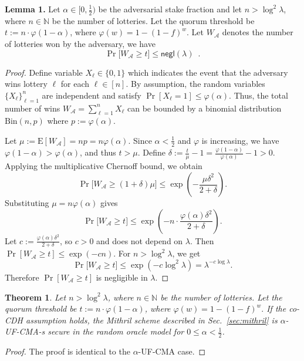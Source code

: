 \documentclass{article}
\newtheorem{theorem}{Theorem}[section]
\begin{document}

\noindent
\textbf{Lemma 1.}
Let $\alpha \in [0,\tfrac12)$ be the adversarial stake fraction and let $n>\log^2\lambda$, where $n\in\mathbb{N}$ be the number of lotteries. Let the quorum threshold be $t :=  n\cdot \varphi(1-\alpha)$, where $\varphi(w) = 1-(1-f)^w.$ 
Let $W_{\mathcal{A}}$ denotes the number of lotteries won by the adversary, we have  
\[
\Pr\big[W_{\mathcal{A}} \ge t\big] \le \mathsf{negl}(\lambda) \enspace.
\]

\begin{proof}
Define variable $X_\ell\in\{0,1\}$ which indicates the event that the adversary wins lottery $\ell$ for each $\ell\in[n]$. By assumption, the random variables $\{X_\ell\}_{\ell=1}^n$ are independent and satisfy $\Pr[X_\ell=1]\le \varphi(\alpha)$. Thus, the total number of wins $W_{\mathcal{A}}=\sum_{\ell=1}^n X_\ell$ can be bounded by a binomial distribution $\mathrm{Bin}(n,p)$ where $p:=\varphi(\alpha)$.

Let $\mu := \mathrm{E}[W_{\mathcal{A}}]=np=n\varphi(\alpha)$. Since $\alpha<\tfrac12$ and $\varphi$ is increasing, we have $\varphi(1-\alpha)>\varphi(\alpha)$, and thus $t>\mu$. Define $\delta := \frac{t}{\mu}-1 = \frac{\varphi(1-\alpha)}{\varphi(\alpha)}-1>0$. Applying the multiplicative Chernoff bound, we obtain
\[
\Pr\big[W_{\mathcal{A}} \ge (1+\delta)\mu\big] \le \exp\!\left(-\frac{\mu\delta^2}{2+\delta}\right).
\]
Substituting $\mu=n\varphi(\alpha)$ gives
\[
\Pr\big[W_{\mathcal{A}} \ge t\big] \le \exp\!\left(-n\cdot \frac{\varphi(\alpha)\delta^2}{2+\delta}\right).
\]
Let $c := \frac{\varphi(\alpha)\delta^2}{2+\delta}$, so $c>0$ and does not depend on $\lambda$. Then $\Pr[W_{\mathcal{A}} \ge t] \le \exp(-cn)$. For $n>\log^2\lambda$, we get
\[
\Pr\big[W_{\mathcal{A}} \ge t\big] \le \exp(-c\log^2\lambda)=\lambda^{-c\log\lambda}.
\]
Therefore $\Pr[W_{\mathcal{A}}\ge t]$ is negligible in $\lambda$.
\end{proof}

\begin{theorem}
Let $n>\log^2\lambda$, where $n\in\mathbb{N}$ be the number of lotteries. Let the quorum threshold be $t :=  n\cdot \varphi(1-\alpha)$, where $\varphi(w) = 1-(1-f)^w.$  If the co-CDH assumption holds, the Mithril scheme described in Sec.~\ref{sec:mithril} is $\alpha$-\textsf{UF-CMA-s} secure in the random oracle model for $0\leq\alpha<\frac{1}{2}$. 
\end{theorem}
\begin{proof}
The proof is identical to the $\alpha$-\textsf{UF-CMA} case. %
\end{proof}
\end{document}
